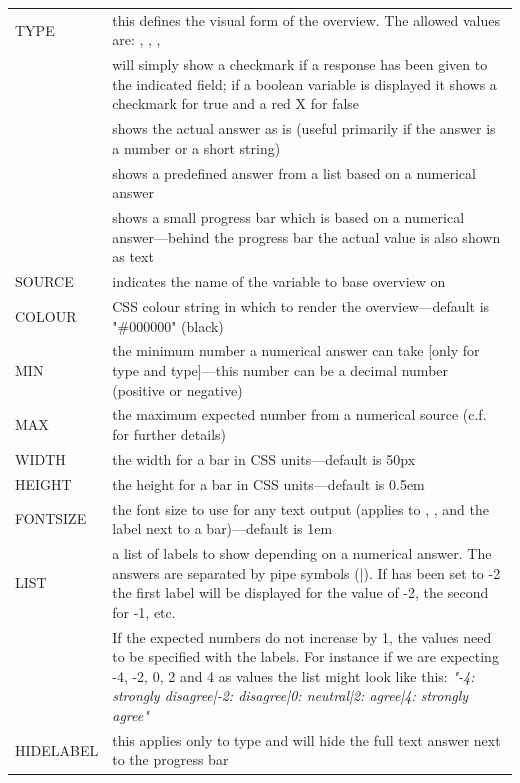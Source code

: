 \documentclass[12pt]{article} %
\newenvironment{keyword}{\leavevmode\color{magenta}}{}
\newenvironment{properties}
	{
    	\footnotesize\renewcommand{\arraystretch}{1.30}
  		\renewcommand{\tabcolsep}{0pt}
   		\begin{longtable}{>{\begin{keyword}}p{3.1cm}<{\end{keyword}}p{13.9cm}}
    	\hline
	}
	{
		\hline\end{longtable}\vspace{5mm}
	}
\begin{document}
\begin{properties}
\hline
TYPE & this defines the visual form of the overview.
The allowed values are: \kw{checkmark}, \kw{value}, \kw{list}, \kw{progress}\\
& \kw{checkmark} will simply show a checkmark if a response has been given to the indicated field; if a boolean variable is displayed it shows a checkmark for true and a red X for false \\
& \kw{value} shows the actual answer as is (useful primarily if the answer is a number or a short string) \\
& \kw{list} shows a predefined answer from a list based on a numerical answer \\
& \kw{progress} shows a small progress bar which is based on a numerical answer—behind the progress bar the actual value is also shown as text\\
SOURCE & indicates the name of the variable to base overview on \\
COLOUR & CSS colour string in which to render the overview—default is "\#000000" (black) \\
MIN & the minimum number a numerical answer can take [only for \kw{list} type and \kw{progress} type]—this number can be a decimal number (positive or negative)\\
MAX & the maximum expected number from a numerical source (c.f. \kw{MIN} for further details) \\
WIDTH & the width for a \kw{progress} bar in CSS units—default is 50px \\
HEIGHT & the height for a \kw{progress} bar in CSS units—default is 0.5em \\
FONTSIZE & the font size to use for any text output (applies to \kw{checkmark}, \kw{value}, \kw{list} and the label next to a \kw{progress} bar)—default is 1em \\
LIST & a list of labels to show depending on a numerical answer.
The answers are separated by pipe symbols (|).
If \kw{MIN} has been set to -2 the first label will be displayed for the value of -2, the second for -1, etc. \\
& If the expected numbers do not increase by 1, the values need to be specified with the labels.
For instance if we are expecting -4, -2, 0, 2 and 4 as values the list might look like this: \textit{"-4: strongly disagree|-2: disagree|0: neutral|2: agree|4: strongly agree"}\\
HIDELABEL & this applies only to \kw{progress} type and will hide the full text answer next to the progress bar\\
\hline
\end{properties}
\vspace{0.1cm}
\end{document}
